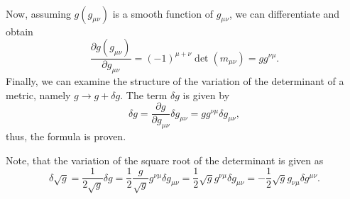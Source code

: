 \documentclass[a4paper,11pt]{article}
\numberwithin{equation}{section}
\begin{document}
{\begin{align}
\end{align} Now, assuming $g(g_{\mu\nu})$ is a smooth function of $g_{\mu\nu}$, we can differentiate and obtain \begin{equation}
\frac{\partial g(g_{\mu\nu})}{\partial g_{\mu\nu}} = (-1)^{\mu+\nu}\det(m_{\mu\nu}) = g g^{\nu\mu}.
\end{equation} Finally, we can examine the structure of the variation of the determinant of a metric, namely $g \rightarrow g  + \delta g$. The term $\delta g$ is given by \begin{equation}
\delta g = \frac{\partial g}{\partial g_{\mu\nu}}\delta g_{\mu\nu} = g g^{\nu\mu} \delta g_{\mu\nu},
\end{equation} thus, the formula is proven. 

Note, that the variation of the square root of the determinant is given as \begin{equation}
\delta \sqrt{g} = \frac{1}{2\sqrt{g}}\delta g = \frac{1}{2}\frac{g}{\sqrt{g}} g^{\nu\mu}\delta g_{\mu\nu} = \frac{1}{2}\sqrt{g} g^{\nu\mu}\delta g_{\mu\nu} = -\frac{1}{2}\sqrt{g}g_{\nu\mu}\delta g^{\mu\nu}.
\end{equation}
}
\end{document}
